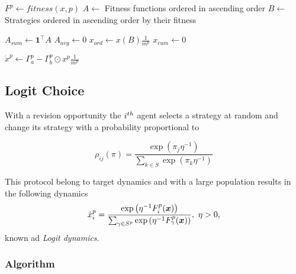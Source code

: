 \begin{algorithm}[H]

 \BlankLine
  {
  $ F^p \leftarrow fitness(x, p)$\;
  $A \leftarrow$ Fitness functions ordered in ascending order\;
  $B \leftarrow$ Strategies ordered in ascending order by their fitness  \;
  
  $A_{sum} \leftarrow \boldsymbol{1}^\top A$\;
  $A_{avg} \leftarrow 0$\;
  $x_{ord} \leftarrow x(B)\frac{1}{m^p} $\;
  $x_{cum} \leftarrow 0$\;
  
  $ \dot{x}^p \leftarrow \Gamma_a^p - \Gamma_b^p \odot x^p \frac{1}{m^p}$\;
 }
\end{algorithm}




\subsection{Logit Choice}

With a revision opportunity the $i^{th}$ agent selects a strategy at random and change its strategy with a probability proportional to 

\begin{equation}
\rho_{ij}(\pi) = \frac{ \exp(\pi_j \eta^{-1} ) }{ \sum_{k \in S} \exp(\pi_k \eta^{-1} ) }
\end{equation}

This protocol belong to target dynamics and with a large population results in the following dynamics
\begin{equation}\label{eq:logit}
 \dot{x}_i^p = \frac{ \exp\left(\eta^{-1} F_i^p (\boldsymbol{x}) \right) }{ \sum_{\gamma \in S^p} \exp\left(\eta^{-1} F_\gamma^p (\boldsymbol{x}) \right) }, \, \, \eta>0,
\end{equation}
known ad \emph{Logit dynamics}. 



\subsubsection*{Algorithm}


